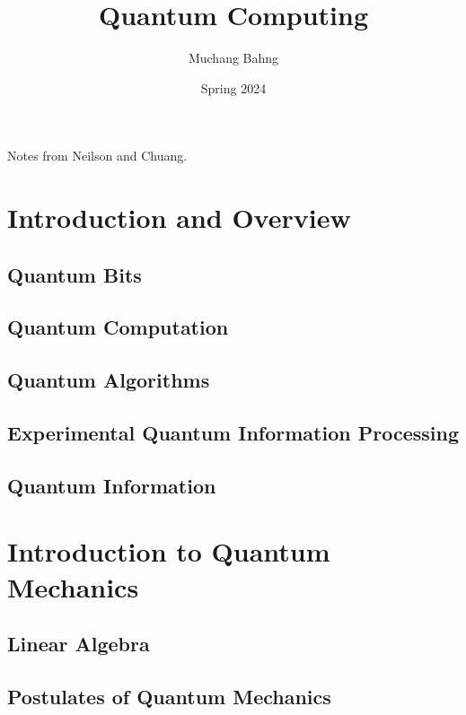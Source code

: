 \documentclass{article}
\theoremstyle{definition}
\begin{document}
\pagestyle{fancy}

\cfoot{\thepage / \pageref{LastPage}}

\title{Quantum Computing}
\author{Muchang Bahng}
\date{Spring 2024}

\maketitle
\tableofcontents
\pagebreak 

Notes from Neilson and Chuang. 

\section{Introduction and Overview}

   

  \subsection{Quantum Bits}

  \subsection{Quantum Computation}

  \subsection{Quantum Algorithms}

  \subsection{Experimental Quantum Information Processing}

  \subsection{Quantum Information}

\section{Introduction to Quantum Mechanics}

  \subsection{Linear Algebra}

  \subsection{Postulates of Quantum Mechanics}
\end{document}
